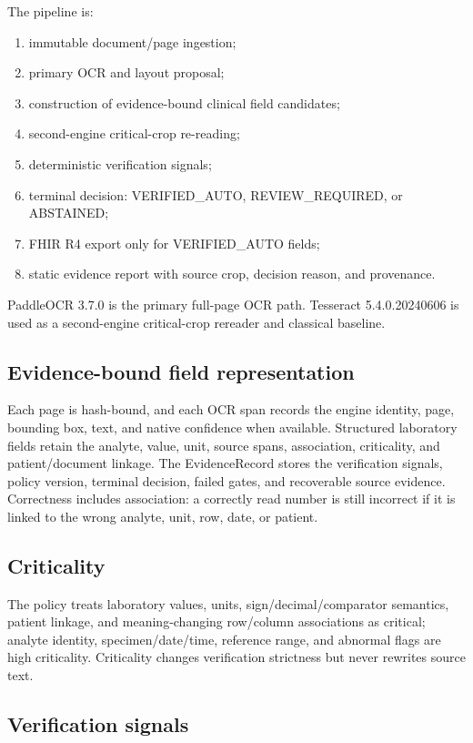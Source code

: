 \documentclass[10pt]{article}
\begin{document}
The pipeline is:

\begin{enumerate}
\item immutable document/page ingestion;
\item primary OCR and layout proposal;
\item construction of evidence-bound clinical field candidates;
\item second-engine critical-crop re-reading;
\item deterministic verification signals;
\item terminal decision: VERIFIED\_AUTO, REVIEW\_REQUIRED, or ABSTAINED;
\item FHIR R4 export only for VERIFIED\_AUTO fields;
\item static evidence report with source crop, decision reason, and provenance.
\end{enumerate}

PaddleOCR 3.7.0 is the primary full-page OCR path. Tesseract 5.4.0.20240606 is used as a second-engine critical-crop rereader and classical baseline.

\subsection{Evidence-bound field representation}

Each page is hash-bound, and each OCR span records the engine identity, page, bounding box, text, and native confidence when available. Structured laboratory fields retain the analyte, value, unit, source spans, association, criticality, and patient/document linkage. The EvidenceRecord stores the verification signals, policy version, terminal decision, failed gates, and recoverable source evidence. Correctness includes association: a correctly read number is still incorrect if it is linked to the wrong analyte, unit, row, date, or patient.

\subsection{Criticality}

The policy treats laboratory values, units, sign/decimal/comparator semantics, patient linkage, and meaning-changing row/column associations as critical; analyte identity, specimen/date/time, reference range, and abnormal flags are high criticality. Criticality changes verification strictness but never rewrites source text.

\subsection{Verification signals}
\end{document}
